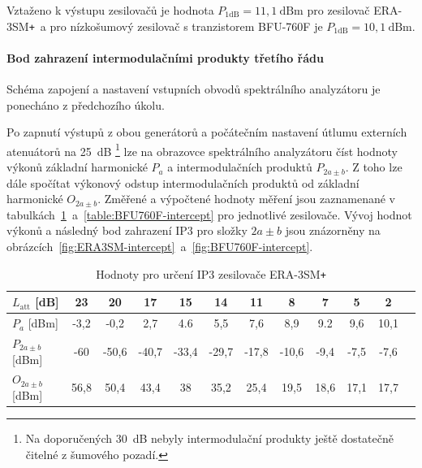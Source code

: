 \documentclass[11pt,a4paper]{article}
\newcommand{\plus}{{\texttt{+}}}
\begin{document}
Vztaženo k výstupu zesilovačů je hodnota $P_{1\mathrm{dB}} = 11,1~\mathrm{dBm}$ pro zesilovač ERA-3SM\plus~a pro nízkošumový zesilovač s tranzistorem BFU-760F je $P_{1\mathrm{dB}} = 10,1~\mathrm{dBm}$.

\paragraph*{Bod zahrazení intermodulačními produkty třetího řádu}
Schéma zapojení a nastavení vstupních obvodů spektrálního analyzátoru je ponecháno z předchozího úkolu.

Po zapnutí výstupů z obou generátorů a počátečním nastavení útlumu externích atenuátorů na 25~dB%
    \footnote{Na doporučených 30~dB nebyly intermodulační produkty ještě dostatečně čitelné z šumového pozadí.}
lze na obrazovce spektrálního analyzátoru číst hodnoty výkonů základní harmonické $P_a$ a intermodulačních produktů $P_{2a\pm b}$. Z toho lze dále spočítat výkonový odstup intermodulačních produktů od základní harmonické $O_{2a\pm b}$. Změřené a výpočtené hodnoty měření jsou zaznamenané v tabulkách~\ref{table:ERA3SM-intercept}~a~\ref{table:BFU760F-intercept} pro jednotlivé zesilovače. Vývoj hodnot výkonů a následný bod zahrazení IP3 pro složky $2a \pm b$ jsou znázorněny na obrázcích~\ref{fig:ERA3SM-intercept}~a~\ref{fig:BFU760F-intercept}.

\begin{table}[!ht]
\begin{center}
\begin{tabular}{| l || c | c | c | c | c | c | c | c | c | c | c |}
    \hline
    $L_{\mathrm{att}}$ [dB] & 23 & 20 & 17 & 15 & 14 & 11 & 8 & 7 & 5 & 2 \\
    \hline
    $P_a$ [dBm] & -3,2 & -0,2 & 2,7 & 4.6 & 5,5 & 7,6 & 8,9 & 9.2 & 9,6 & 10,1 \\
    \hline
    $P_{2a \pm b}$ [dBm] & -60 & -50,6 & -40,7 & -33,4 & -29,7 & -17,8 & -10,6 & -9,4 & -7,5 & -7,6 \\
    \hline\hline
    $O_{2a \pm b}$ [dBm] & 56,8 & 50,4 & 43,4 & 38 & 35,2 & 25,4 & 19,5 & 18,6 & 17,1 & 17,7 \\
    \hline
\end{tabular}
\caption{Hodnoty pro určení IP3 zesilovače ERA-3SM\plus}
\label{table:ERA3SM-intercept}
\end{center}
\end{table}
\end{document}
